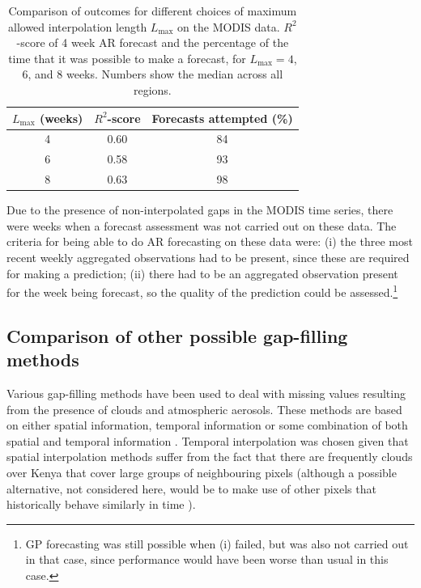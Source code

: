 \documentclass[review]{elsarticle}
\begin{document}
\begin{table}
	\caption{Comparison of outcomes for different choices of maximum allowed interpolation length $L_{\mathrm{max}}$ on the MODIS data. $R^2$-score of 4 week AR forecast and the percentage of the time that it was possible to make a forecast, for $L_{\mathrm{max}}=4$, 6, and 8 weeks. Numbers show the median across all regions.} \label{tab:IL choices}
	\centering
	\begin{tabular}{ccc} 
		\toprule
		\textbf{$L_{\mathrm{max}}$ (weeks)}   & \textbf{$R^2$-score}    & \textbf{Forecasts attempted (\%)}\\
		\midrule
		4  & 0.60 & 84 \\
		6  & 0.58 & 93 \\
		8 & 0.63 & 98 \\
		\bottomrule
	\end{tabular}
\end{table}

Due to the presence of non-interpolated gaps in the MODIS time series, there were weeks when a forecast assessment was not carried out on these data. The criteria for being able to do AR forecasting on these data were: (i) the three most recent weekly aggregated observations had to be present, since these are required for making a prediction; (ii) there had to be an aggregated observation present for the week being forecast, so the quality of the prediction could be assessed.\footnote{GP forecasting was still possible when (i) failed, but was also not carried out in that case, since performance would have been worse than usual in this case.}


\subsection{Comparison of other possible gap-filling methods} \label{sec:compare}
Various gap-filling methods have been used to deal with missing values resulting from the presence of clouds and atmospheric aerosols. These methods are based on either spatial information, temporal information or some combination of both spatial and temporal information \citep{bg-10-4055-2013, Weiss2014}. Temporal interpolation was chosen given that spatial interpolation methods suffer from the fact that there are frequently clouds over Kenya that cover large groups of neighbouring pixels (although a possible alternative, not considered here, would be to make use of other pixels that historically behave similarly in time \citep{Cao:2018}).
\end{document}
